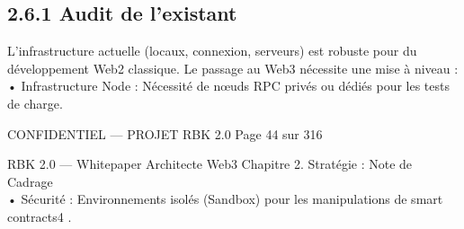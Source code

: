 \subsection{2.6.1 Audit de l’existant}
L’infrastructure actuelle (locaux, connexion, serveurs) est robuste pour du développement Web2 classique. Le passage au Web3 nécessite une mise à niveau :\\
• Infrastructure Node : Nécessité de nœuds RPC privés ou dédiés pour les tests de charge.\\
\vspace{0.5em}
\vspace{0.5em}
\vspace{0.5em}
\begin{confidential}CONFIDENTIEL — PROJET RBK 2.0                                                Page 44 sur 316\end{confidential}
RBK 2.0 — Whitepaper Architecte Web3                                                                                         Chapitre 2. Stratégie : Note de Cadrage\\
\vspace{0.5em}
\vspace{0.5em}
• Sécurité : Environnements isolés (Sandbox) pour les manipulations de smart contracts4 .\\
\vspace{0.5em}
\vspace{0.5em}
